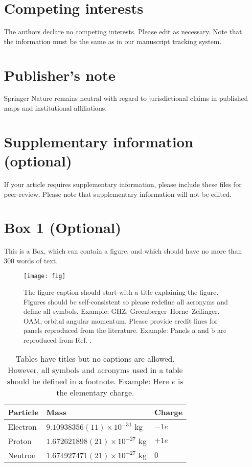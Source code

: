 \documentclass[fleqn,10pt]{wlscirep}
\begin{document}
\section*{Competing interests}
The authors declare no competing interests. Please edit as necessary. Note that the information must be the same as in our manuscript tracking system.

\section*{Publisher’s note}
Springer Nature remains neutral with regard to jurisdictional claims in published maps and institutional affiliations.

\section*{Supplementary information (optional)}
If your article requires supplementary information, please include these files for peer-review. Please note that supplementary information will not be edited.

\newpage
\section*{Box 1 (Optional)}
This is a Box, which can contain a figure, and which should have no more than 300 words of text.

\begin{figure}[ht]
\centering
\texttt{[image: fig]}
\caption{The figure caption should start with a title explaining the figure. Figures should be self-consistent so please redefine all acronyms and define all symbols. Example: GHZ, Greenberger–Horne–Zeilinger, OAM, orbital angular momentum. Please provide credit lines for panels reproduced from the literature. Example: Panels a and b are reproduced from Ref. \cite{TR}.}
\label{fig}
\end{figure}

\begin{table}[ht]
\centering
\begin{tabular}{|l|l|l|}
\hline
Particle & Mass & Charge \\
\hline
Electron & $9.10938356(11)\times10^{-31}$ kg & $-1e$ \\
\hline
Proton & $1.672621898(21)\times10^{-27}$ kg & $+1e$ \\
\hline
Neutron & $1.674927471(21)\times10^{-27}$ kg & $0$ \\
\hline
\end{tabular}
\caption{\label{tab}Tables have titles but no captions are allowed. However, all symbols and acronyms used in a table should be defined in a footnote. Example: Here $e$ is the elementary charge.}
\end{table}
\end{document}
